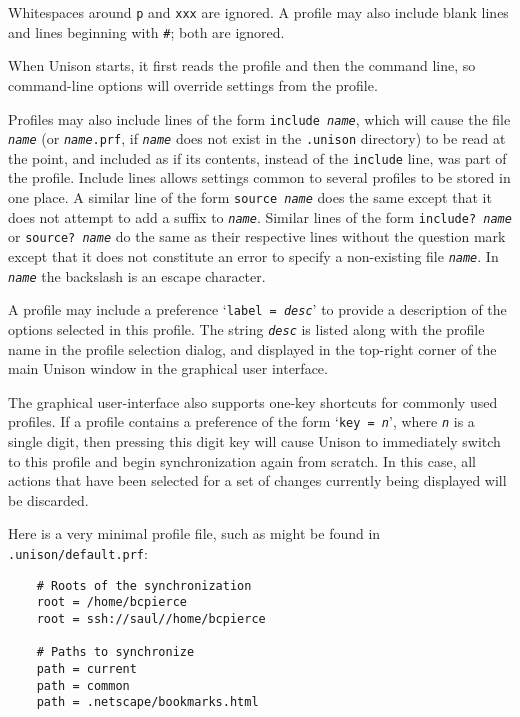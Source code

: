 \documentclass{article}
\newcommand{\ARG}[1]{\texttt{\textit{#1}}}
\begin{document}
Whitespaces around {\tt p} and {\tt xxx} are ignored.
A profile may also include blank lines and lines beginning
with {\tt \#}; both are ignored.

When Unison starts, it first reads the profile and then the command
line, so command-line options will override settings from the
profile.

Profiles may also include lines of the form \texttt{include \ARG{name}},
which will cause the file \ARG{name} (or \texttt{\ARG{name}.prf}, if
\ARG{name} does not exist in the \verb+.unison+ directory) to be read at
the point, and included as if its contents, instead of the \texttt{include}
line, was part of the profile.  Include lines allows settings common to
several profiles to be stored in one place.
A similar line of the form \texttt{source \ARG{name}} does the same except
that it does not attempt to add a suffix to \ARG{name}.
Similar lines of the form \texttt{include\mbox{?} \ARG{name}} or
\texttt{source\mbox{?} \ARG{name}} do the same as their respective lines
without the question mark except that it does not constitute an error to
specify a non-existing file \ARG{name}.
In \ARG{name} the backslash is an escape character.

A profile may include a preference `\texttt{label = \ARG{desc}}' to
provide a description of the options selected in this profile.  The
string \ARG{desc} is listed along with the profile name in the profile
selection dialog, and displayed in the top-right corner of the main
Unison window in the graphical user interface.

The graphical user-interface also supports one-key shortcuts for commonly
used profiles.  If a profile contains a preference of the form
%
`\texttt{key = \ARG{n}}', where \ARG{n} is a single digit, then
pressing this digit key will cause Unison to immediately switch to
this profile and begin synchronization again from scratch.  In this
case, all actions that have been selected for a set of changes
currently being displayed will be discarded.




Here is a very minimal profile file, such as might be found in {\tt
  .unison/default.prf}:
\begin{verbatim}
    # Roots of the synchronization
    root = /home/bcpierce
    root = ssh://saul//home/bcpierce

    # Paths to synchronize
    path = current
    path = common
    path = .netscape/bookmarks.html
\end{verbatim}
\end{document}
